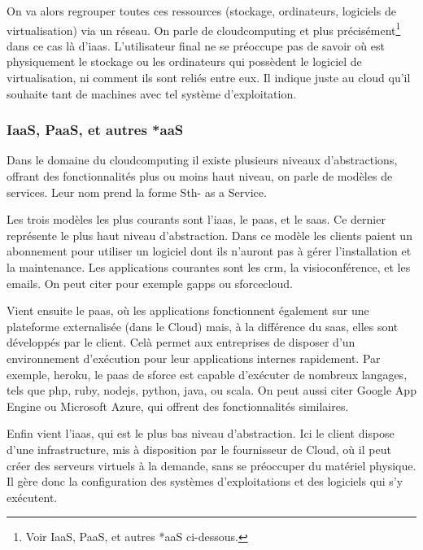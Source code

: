 \documentclass[a4paper,oneside]{report}
\begin{document}
On va alors regrouper toutes ces ressources (stockage, ordinateurs, logiciels de \gls{virtualisation}) via un réseau.
On parle de \gls{cloudcomputing} et plus précisément\footnote{Voir \og IaaS, PaaS, et autres *aaS \fg ci-dessous.} dans ce cas là d’\gls{iaas}.
L'utilisateur final ne se préoccupe pas de savoir où est physiquement le stockage ou les ordinateurs qui possèdent le logiciel de \gls{virtualisation}, ni comment ils sont reliés entre eux. Il indique juste au cloud qu’il souhaite tant de machines avec tel système d'exploitation.

\subsubsection{IaaS, PaaS, et autres *aaS}
Dans le domaine du \gls{cloudcomputing} il existe plusieurs niveaux d’abstractions, offrant des fonctionnalités plus ou moins haut niveau, on parle de modèles de services.
Leur nom prend la forme Sth- as a Service.

Les trois modèles les plus courants sont l'\gls{iaas}, le \gls{paas}, et le \gls{saas}.
Ce dernier représente le plus haut niveau d'abstraction.\newline
Dans ce modèle les clients paient un abonnement pour utiliser un logiciel dont ils n'auront pas à gérer l'installation et la maintenance.
Les applications courantes sont les \gls{crm}, la visioconférence, et les emails.
On peut citer pour exemple \gls{gapps} ou \gls{sforcecloud}.

Vient ensuite le \gls{paas}, où les applications fonctionnent également sur une plateforme externalisée (dans le Cloud) mais, à la différence du \gls{saas}, elles sont développés par le client.\newline
Celà permet aux entreprises de disposer d'un environnement d'exécution pour leur applications internes rapidement.
Par exemple, \gls{heroku}, le \gls{paas} de \gls{sforce} est capable d'exécuter de nombreux langages, tels que \gls{php}, \gls{ruby}, \gls{nodejs}, \gls{python}, \gls{java}, ou \gls{scala}.
On peut aussi citer Google App Engine ou Microsoft Azure, qui offrent des fonctionnalités similaires.

Enfin vient l'\gls{iaas}, qui est le plus bas niveau d'abstraction. 
Ici le client dispose d'une infrastructure, mis à disposition par le fournisseur de Cloud, où il peut créer des serveurs virtuels à la demande, sans se préoccuper du matériel physique.
Il gère donc la configuration des systèmes d'exploitations et des logiciels qui s'y exécutent.
\end{document}
